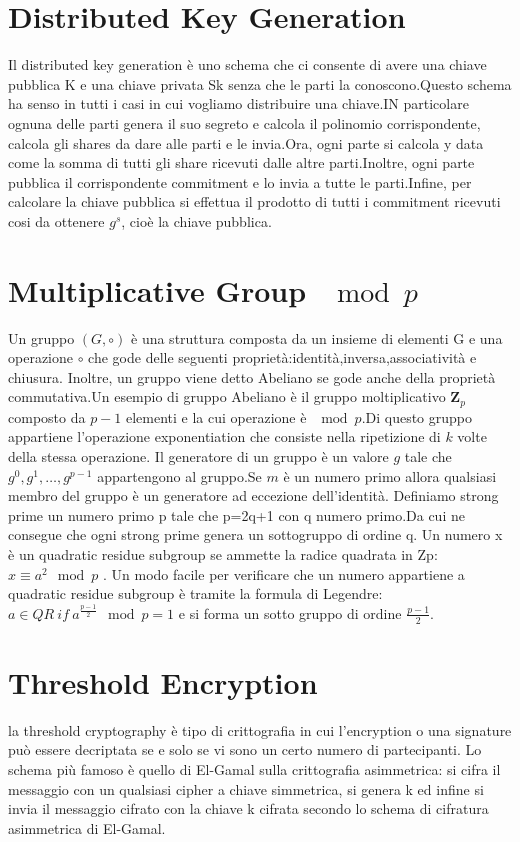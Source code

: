 \documentclass{book}
\begin{document}
\section{Distributed Key Generation}
Il distributed key generation è uno schema che ci consente di avere una chiave pubblica K e una chiave privata Sk senza che le parti la conoscono.Questo schema ha senso in tutti i casi in cui vogliamo distribuire una chiave.IN particolare ognuna delle parti genera il suo segreto e calcola il polinomio corrispondente, calcola gli shares da dare alle parti e le invia.Ora, ogni parte si calcola y data come la somma di tutti gli share ricevuti dalle altre parti.Inoltre, ogni parte pubblica il corrispondente commitment e lo invia a tutte le parti.Infine, per calcolare la chiave pubblica si effettua il prodotto di tutti i commitment ricevuti cosi da ottenere \(g^{s}\), cioè la chiave pubblica.
\section{Multiplicative Group \(\mod{p}\)}
Un gruppo \((G,\circ  )\) è una struttura composta da un insieme di elementi G e una operazione \(\circ \) che gode delle seguenti proprietà:identità,inversa,associatività e chiusura. Inoltre, un gruppo viene detto Abeliano se gode anche della proprietà commutativa.Un esempio di gruppo Abeliano è il gruppo moltiplicativo \(\mathbf{Z}_{p}\) composto da \(p-1\) elementi e la cui operazione è \(\mod{p}\).Di questo gruppo appartiene l'operazione exponentiation che consiste nella ripetizione di \(k\) volte della stessa operazione\@.\newline
Il generatore di un gruppo è un valore \(g\) tale che \( {g^{0},g^{1},\ldots ,g^{p-1} } \) appartengono al gruppo.Se \(m\) è un numero primo allora qualsiasi membro del gruppo è un generatore ad eccezione dell'identità\@.\newline
Definiamo strong prime un numero primo p tale che p=2q+1 con q numero primo.Da cui ne consegue che ogni strong prime genera un sottogruppo di ordine q\@.\newline
Un numero x è un quadratic residue subgroup se ammette la radice quadrata in Zp: \(x\equiv a^{2}\mod{p}\) \@.\newline
Un modo facile per verificare che un numero appartiene a quadratic residue subgroup è tramite la formula di Legendre:\(a\in QR\ if\ a^{\frac{p-1}{2}}\mod{p}=1\) e si forma un sotto gruppo di ordine \(\frac{p-1}{2}\).
\section{Threshold Encryption}
la threshold cryptography è tipo di crittografia in cui l'encryption o una signature può essere decriptata se e solo se vi sono un certo numero di partecipanti. Lo schema più famoso è quello di El-Gamal sulla crittografia asimmetrica: si cifra il messaggio con un qualsiasi cipher a chiave simmetrica, si genera k ed infine si invia il messaggio cifrato con la chiave k cifrata secondo lo schema di cifratura asimmetrica di El-Gamal.
\end{document}
